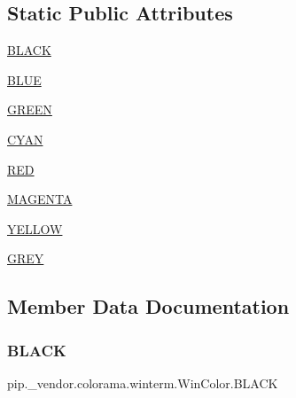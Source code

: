 \subsection*{Static Public Attributes}
\begin{DoxyCompactItemize}
\item 
\hyperlink{classpip_1_1__vendor_1_1colorama_1_1winterm_1_1WinColor_ae358024769710534d48cec93430e77e7}{B\+L\+A\+CK}
\item 
\hyperlink{classpip_1_1__vendor_1_1colorama_1_1winterm_1_1WinColor_a07382055546be6893fb957885876f676}{B\+L\+UE}
\item 
\hyperlink{classpip_1_1__vendor_1_1colorama_1_1winterm_1_1WinColor_abc2e169b89d1fd416218a401621bbe68}{G\+R\+E\+EN}
\item 
\hyperlink{classpip_1_1__vendor_1_1colorama_1_1winterm_1_1WinColor_a50ea73b02ed75e4c3e70b4d414d498bd}{C\+Y\+AN}
\item 
\hyperlink{classpip_1_1__vendor_1_1colorama_1_1winterm_1_1WinColor_aeb3219f7a5b489ea48949cd305a80de9}{R\+ED}
\item 
\hyperlink{classpip_1_1__vendor_1_1colorama_1_1winterm_1_1WinColor_af746a9b3b0777a5783ae7e6bb62233f7}{M\+A\+G\+E\+N\+TA}
\item 
\hyperlink{classpip_1_1__vendor_1_1colorama_1_1winterm_1_1WinColor_a0283dc2bbef1bd9beb6ad70bbab8538e}{Y\+E\+L\+L\+OW}
\item 
\hyperlink{classpip_1_1__vendor_1_1colorama_1_1winterm_1_1WinColor_ada2cacbe15904d722b3bcde3dd8613ab}{G\+R\+EY}
\end{DoxyCompactItemize}


\subsection{Member Data Documentation}
\mbox{\label{classpip_1_1__vendor_1_1colorama_1_1winterm_1_1WinColor_ae358024769710534d48cec93430e77e7}} 
\subsubsection{\texorpdfstring{B\+L\+A\+CK}{BLACK}}
{\footnotesize\ttfamily pip.\+\_\+vendor.\+colorama.\+winterm.\+Win\+Color.\+B\+L\+A\+CK\hspace{0.3cm}{\ttfamily [static]}}


